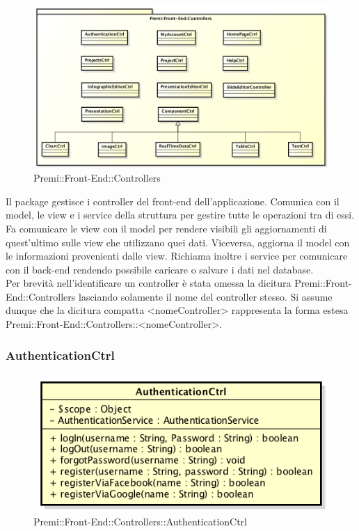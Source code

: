 \begin{figure}[h]
	\centering
	\includegraphics[width=1.0\linewidth]{img/premi_front_end_controllers}
	\caption[Premi::Front-End::Controllers]{Premi::Front-End::Controllers}
\end{figure}
Il package gestisce i controller del front-end dell'applicazione. Comunica con il model, le view e i service della struttura per gestire tutte le operazioni tra di essi. Fa comunicare le view con il model per rendere visibili gli aggiornamenti di quest'ultimo sulle view che utilizzano quei dati. Viceversa, aggiorna il model con le informazioni provenienti dalle view. Richiama inoltre i service per comunicare con il back-end rendendo possibile caricare o salvare i dati nel database.\\
Per brevità nell'identificare un controller è stata omessa la dicitura Premi::Front-End::Controllers lasciando solamente il nome del controller stesso. Si assume dunque che la dicitura compatta <nomeController> rappresenta la forma estesa Premi::Front-End::Controllers::<nomeController>.

\newpage
\subsubsection{AuthenticationCtrl}
\begin{figure}[h]
	\centering
	\includegraphics[width=0.5\linewidth]{img/premi_front_end_controllers_authenticationctrl}
	\caption[Premi::Front-End::Controllers::AuthenticationCtrl]{Premi::Front-End::Controllers::AuthenticationCtrl}
\end{figure}
